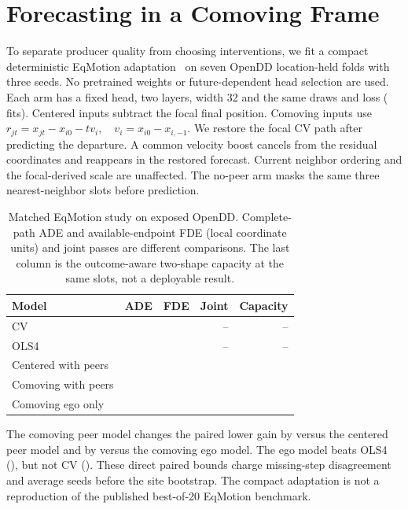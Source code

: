 \section{Forecasting in a Comoving Frame}

To separate producer quality from choosing interventions, we fit
a compact deterministic EqMotion adaptation~\cite{eqmotion} on seven
OpenDD location-held folds with three seeds. No pretrained weights
or future-dependent head selection are used. Each arm has a fixed
head, two layers, width 32 and the same draws and loss
(\MovingEqFits{} fits). Centered inputs subtract the focal final
position. Comoving inputs use
\(
 r_{jt}=x_{jt}-x_{i0}-t v_i,
 \quad v_i=x_{i0}-x_{i,-1}.
\)
We restore the focal CV path after predicting the departure.
A common velocity boost cancels from the residual coordinates and
reappears in the restored forecast. Current neighbor ordering and
the focal-derived scale are unaffected. The no-peer arm masks
the same three nearest-neighbor slots before prediction.

\begin{table}[h]
\centering
\caption{Matched EqMotion study on exposed OpenDD. Complete-path ADE
and available-endpoint FDE (local coordinate units) and joint passes are
different comparisons. The last column is the outcome-aware
two-shape capacity at the same slots, not a deployable result.}
\small
\begin{tabular}{lrrrr}
\toprule
Model & ADE & FDE & Joint & Capacity \\
\midrule
CV & \MovingEqCVADE{} & \MovingEqCVFDE{} & -- & -- \\
OLS4 & \MovingEqOLSADE{} & \MovingEqOLSFDE{} & -- & -- \\
Centered with peers & \MovingEqCenteredADE{} & \MovingEqCenteredFDE{} &
\MovingEqCenteredPass{} & \MovingEqCenteredCapacity{} \\
Comoving with peers & \MovingEqMovingADE{} & \MovingEqMovingFDE{} &
\MovingEqMovingPass{} & \MovingEqMovingCapacity{} \\
Comoving ego only & \MovingEqEgoADE{} & \MovingEqEgoFDE{} &
\MovingEqEgoPass{} & \MovingEqEgoCapacity{} \\
\bottomrule
\end{tabular}
\end{table}

The comoving peer model changes the paired lower gain by
\MovingEqFrameEffect{} versus the centered peer model and by
\MovingEqPeerEffect{} versus the comoving ego model. The ego
model beats OLS4 (\MovingEqEgoVsOLS{}), but not CV
(\MovingEqEgoVsCV{}). These direct paired bounds charge
missing-step disagreement and average seeds before the site
bootstrap. The compact adaptation is not a reproduction of the
published best-of-20 EqMotion benchmark.

